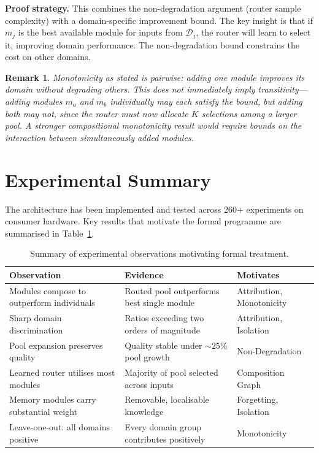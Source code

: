 \documentclass[11pt,a4paper]{article}
\newtheorem{remark}{Remark}
\begin{document}
\noindent\textbf{Proof strategy.} This combines the non-degradation argument (router sample complexity) with a domain-specific improvement bound. The key insight is that if $m_j$ is the best available module for inputs from $\mathcal{D}_j$, the router will learn to select it, improving domain performance. The non-degradation bound constrains the cost on other domains.

\begin{remark}
Monotonicity as stated is pairwise: adding one module improves its domain without degrading others. This does not immediately imply transitivity---adding modules $m_a$ and $m_b$ individually may each satisfy the bound, but adding both may not, since the router must now allocate $K$ selections among a larger pool. A stronger compositional monotonicity result would require bounds on the interaction between simultaneously added modules.
\end{remark}

\section{Experimental Summary}
\label{sec:experiments}

The architecture has been implemented and tested across 260+ experiments on consumer hardware. Key results that motivate the formal programme are summarised in Table~\ref{tab:experiments}.

\begin{table}[h]
\centering
\caption{Summary of experimental observations motivating formal treatment.}
\label{tab:experiments}
\begin{tabular}{@{}lll@{}}
\toprule
\textbf{Observation} & \textbf{Evidence} & \textbf{Motivates} \\
\midrule
Modules compose to outperform individuals & Routed pool outperforms best single module & Attribution, Monotonicity \\
Sharp domain discrimination & Ratios exceeding two orders of magnitude & Attribution, Isolation \\
Pool expansion preserves quality & Quality stable under ${\sim}25\%$ pool growth & Non-Degradation \\
Learned router utilises most modules & Majority of pool selected across inputs & Composition Graph \\
Memory modules carry substantial weight & Removable, localisable knowledge & Forgetting, Isolation \\
Leave-one-out: all domains positive & Every domain group contributes positively & Monotonicity \\
\bottomrule
\end{tabular}
\end{table}
\end{document}

